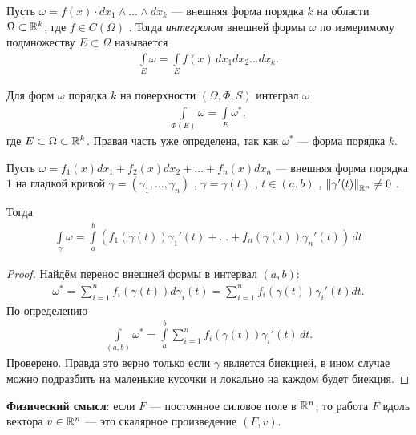 \begin{df}
 Пусть $\omega = f(x) \cdot dx_1 \land \ldots \land dx_k$  --- внешняя форма порядка $k$ на области $\Omega \subset \mathbb{R}^{k}$, где $f \in C(\Omega)$ . Тогда \textit{интегралом} внешней формы $\omega$ по измеримому подмножеству $E \subset \Omega$ называется
 \begin{align*}
  \int\limits_{E} \omega = \int\limits_{E} f(x) \, dx_1 dx_2 \ldots dx_k
 .\end{align*} 

 Для форм $\omega$  порядка $k$  на поверхности $(\Omega, \Phi, S)$  интеграл $\omega$
  \begin{align*}
  \int\limits_{\Phi(E)} \omega = \int\limits_{E} \omega^{\ast}
 ,\end{align*} где $E \subset \Omega \subset \mathbb{R}^{k}$. Правая часть уже определена, так как $\omega^{\ast}$ --- форма порядка $k$.
\end{df}

\begin{claim}
 Пусть $\omega = f_1(x) dx_1 + f_2(x) dx_2 + \ldots + f_{n}(x) dx_n$  --- внешняя форма порядка $1$  на гладкой кривой $\gamma = (\gamma_1, \ldots, \gamma_n )$ , $\gamma = \gamma(t)$ , $t \in (a,b)$ , $\left\| \gamma'(t) \right\|_{\mathbb{R}^{n}} \neq 0$ .

 Тогда
 \begin{align*}
  \int\limits_{\gamma} \omega = \int\limits_{a}^{b} \left( f_1(\gamma(t)) \gamma_1'(t) + \ldots + f_n(\gamma(t)) \gamma_n'(t) \right) \, dt
 \end{align*} 
\end{claim}
\begin{proof}
 Найдём перенос внешней формы в интервал $(a, b)$:
  \begin{align*}
  \omega^{\ast} = \sum_{i=1}^{n} f_i(\gamma(t)) d \gamma_i(t) = \sum_{i=1}^{n} f_i(\gamma(t)) \gamma_i'(t) dt
 .\end{align*} По определению
 \begin{align*}
  \int\limits_{(a,b)} \omega^{\ast} = \int\limits_{a}^{b} \sum_{i=1}^{n} f_i(\gamma(t))\gamma_i'(t)  \, dt
 .\end{align*} Проверено.
 Правда это верно только если $\gamma$ является биекцией, в ином случае можно подразбить на маленькие кусочки и локально на каждом будет биекция.
\end{proof}

\textbf{Физический смысл}: если $F$ --- постоянное силовое поле в $\mathbb{R}^{n}$, то работа $F$ вдоль вектора $v \in \mathbb{R}^{n}$ --- это скалярное произведение $(F, v)$.

